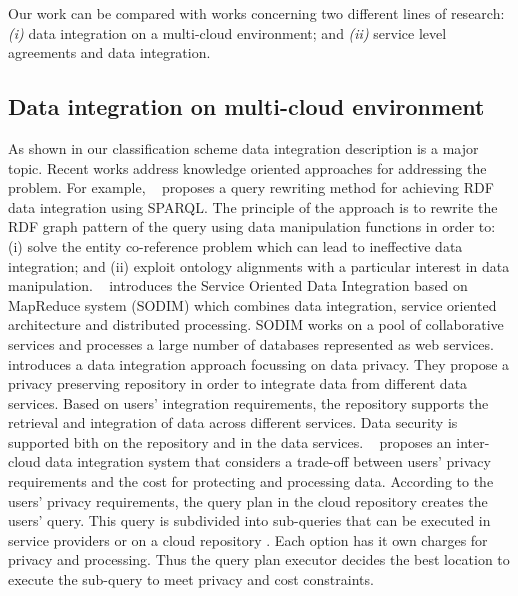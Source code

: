 Our work can be compared with works concerning  two different lines of research:
\textit{(i)} data integration on a multi-cloud environment; and
\textit{(ii)} service level agreements and data integration.


\subsection{Data integration on multi-cloud environment}
As shown in our classification scheme data integration description is a major topic. Recent works address knowledge oriented approaches for addressing the problem. For example, ~\cite{075} proposes a  query rewriting method for achieving RDF data integration
using SPARQL. The principle of the approach is to rewrite the RDF graph pattern of the query using data manipulation functions in order to: (i) solve 
the entity co-reference problem which can lead to ineffective data integration; 
and (ii) exploit ontology alignments with a particular interest in data manipulation. 
~\cite{078} introduces the  Service 
Oriented Data Integration based on MapReduce  system (SODIM)  which combines data integration,
service oriented architecture and distributed processing. SODIM works on a pool of collaborative services and 
processes a large number of databases represented as web services. 
~\cite{YauY08} introduces a data integration approach focussing on data privacy.
They propose a privacy preserving repository in order to integrate data from
different data  services. 
Based on users' integration requirements, the repository supports the retrieval and integration of
data across different services. Data security is supported bith on the repository and in the data  services.
~\cite{096} proposes an inter-cloud data integration system that considers a trade-off between users' privacy requirements and the cost for protecting and processing data.
According to the users' privacy requirements, the query plan  in the cloud repository 
creates the users' query. This query is subdivided into sub-queries that can
be  executed in  service providers or on a cloud repository .
Each option has it own charges for privacy and processing. 
Thus the query plan executor decides the best location to execute the sub-query
to meet privacy and cost constraints.

